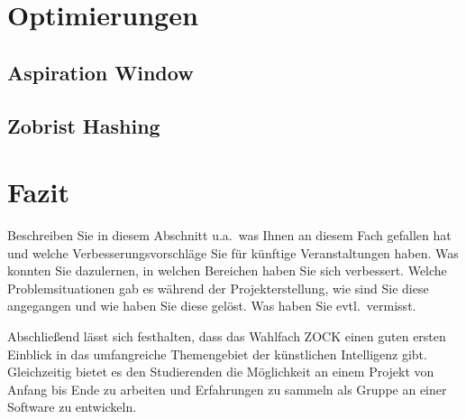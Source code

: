 \documentclass[12pt,a4paper,bibliography=totocnumbered,listof=totocnumbered]{article}
\begin{document}
\newpage
\section{Optimierungen}
\subsection{Aspiration Window}

\subsection{Zobrist Hashing}

\newpage
\section{Fazit}
Beschreiben Sie in diesem Abschnitt u.a.\ was Ihnen an diesem Fach gefallen hat und welche Verbesserungsvorschläge Sie für künftige Veranstaltungen haben. Was konnten Sie dazulernen, in welchen Bereichen haben Sie sich verbessert. Welche Problemsituationen gab es während der Projekterstellung, wie sind Sie diese angegangen und wie haben Sie diese gelöst. Was haben Sie evtl.\ vermisst.

Abschließend lässt sich festhalten, dass das Wahlfach ZOCK einen guten ersten Einblick in das umfangreiche Themengebiet der künstlichen Intelligenz gibt. Gleichzeitig bietet es den Studierenden die Möglichkeit an einem Projekt von Anfang bis Ende zu arbeiten und Erfahrungen zu sammeln als Gruppe an einer Software zu entwickeln. 
\renewcommand\refname{Quellenverzeichnis}


\pagebreak
\end{document}
